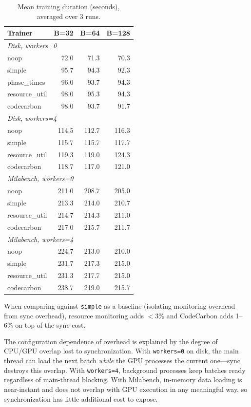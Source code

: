 \documentclass[10pt,twocolumn]{article}
\begin{document}
\begin{table}[H]
\centering
\caption{Mean training duration (seconds), averaged over 3 runs.}
\label{tab:e2e_time}
\small
\begin{tabular}{lrrr}
\toprule
Trainer & B=32 & B=64 & B=128 \\
\midrule
\multicolumn{4}{l}{\textit{Disk, workers=0}} \\
noop            & 72.0 & 71.3 & 70.3 \\
simple          & 95.7 & 94.3 & 92.3 \\
phase\_times    & 96.0 & 93.7 & 94.3 \\
resource\_util  & 98.0 & 95.3 & 94.3 \\
codecarbon      & 98.0 & 93.7 & 91.7 \\
\midrule
\multicolumn{4}{l}{\textit{Disk, workers=4}} \\
noop            & 114.5 & 112.7 & 116.3 \\
simple          & 115.7 & 115.7 & 117.7 \\
resource\_util  & 119.3 & 119.0 & 124.3 \\
codecarbon      & 118.7 & 117.0 & 121.0 \\
\midrule
\multicolumn{4}{l}{\textit{Milabench, workers=0}} \\
noop            & 211.0 & 208.7 & 205.0 \\
simple          & 213.3 & 214.0 & 210.7 \\
resource\_util  & 214.7 & 214.3 & 211.0 \\
codecarbon      & 217.0 & 215.7 & 211.7 \\
\midrule
\multicolumn{4}{l}{\textit{Milabench, workers=4}} \\
noop            & 224.7 & 213.0 & 210.0 \\
simple          & 231.7 & 217.3 & 215.0 \\
resource\_util  & 231.3 & 217.7 & 215.0 \\
codecarbon      & 238.7 & 219.0 & 215.7 \\
\bottomrule
\end{tabular}
\end{table}

When comparing against \texttt{simple} as a baseline (isolating monitoring overhead from sync overhead), resource monitoring adds $<$3\% and CodeCarbon adds 1--6\% on top of the sync cost.

The configuration dependence of overhead is explained by the degree of CPU/GPU overlap lost to synchronization. With \texttt{workers=0} on disk, the main thread can load the next batch \emph{while} the GPU processes the current one---sync destroys this overlap. With \texttt{workers=4}, background processes keep batches ready regardless of main-thread blocking. With Milabench, in-memory data loading is near-instant and does not overlap with GPU execution in any meaningful way, so synchronization has little additional cost to expose.
\end{document}

